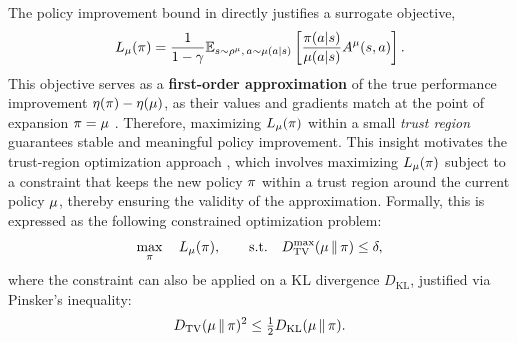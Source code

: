 The policy improvement bound in  directly justifies a surrogate objective,
\begin{equation}  
\label{eq:surrogate}
L_{\operatorname*{{\textcolor{black}{\mu}}}}(\operatorname*{{\textcolor{black}{\pi}}}) = \frac{1}{1 - \gamma}  \mathbb{E}_{s \sim \rho^{\operatorname*{{\textcolor{black}{\mu}}}},\,a \sim \operatorname*{{\textcolor{black}{\mu}}}(a|s)} \left[ \frac{\operatorname*{{\textcolor{black}{\pi}}}(a| s)}{\operatorname*{{\textcolor{black}{\mu}}}(a| s)} A^{\operatorname*{{\textcolor{black}{\mu}}}}(s,a) \right].  
\end{equation}
This objective serves as a \textbf{first-order approximation} of the true performance improvement $\eta(\operatorname*{{\textcolor{black}{\pi}}}) - \eta(\operatorname*{{\textcolor{black}{\mu}}})$, as their values and gradients match at the point of expansion $\operatorname*{{\textcolor{black}{\pi}}}=\operatorname*{{\textcolor{black}{\mu}}}$ \citep{kakade2002approximately, schulman2015trust, zheng2025stabilizing}.
Therefore, maximizing $L_{\operatorname*{{\textcolor{black}{\mu}}}}(\operatorname*{{\textcolor{black}{\pi}}})$ within a small \textit{trust region} guarantees stable and meaningful policy improvement. This insight motivates the trust-region optimization approach \citep{schulman2015trust, xie2024simple}, which involves maximizing $L_{\operatorname*{{\textcolor{black}{\mu}}}}(\operatorname*{{\textcolor{black}{\pi}}})$ subject to a constraint that keeps the new policy $\operatorname*{{\textcolor{black}{\pi}}}$ within a trust region around the current policy $\operatorname*{{\textcolor{black}{\mu}}}$, thereby ensuring the validity of the approximation. Formally, this is expressed as the following constrained optimization problem:
\begin{equation}   
\label{eq:trpo-obj}  
\max_{\operatorname*{{\textcolor{black}{\pi}}}} \quad L_{\operatorname*{{\textcolor{black}{\mu}}}}(\operatorname*{{\textcolor{black}{\pi}}}), \quad \quad 
\text{s.t.} \quad D_{\mathrm{TV}}^{\mathrm{max}}(\operatorname*{{\textcolor{black}{\mu}}} \| \operatorname*{{\textcolor{black}{\pi}}}) \le \delta, 
\end{equation} 
where the constraint can also be applied on a KL divergence $D_{\mathrm{KL}}$, justified via Pinsker’s inequality:
$$D_{\mathrm{TV}}(\operatorname*{{\textcolor{black}{\mu}}} \| \operatorname*{{\textcolor{black}{\pi}}})^2 \le \tfrac{1}{2} D_{\mathrm{KL}}(\operatorname*{{\textcolor{black}{\mu}}} \| \operatorname*{{\textcolor{black}{\pi}}}).$$  
